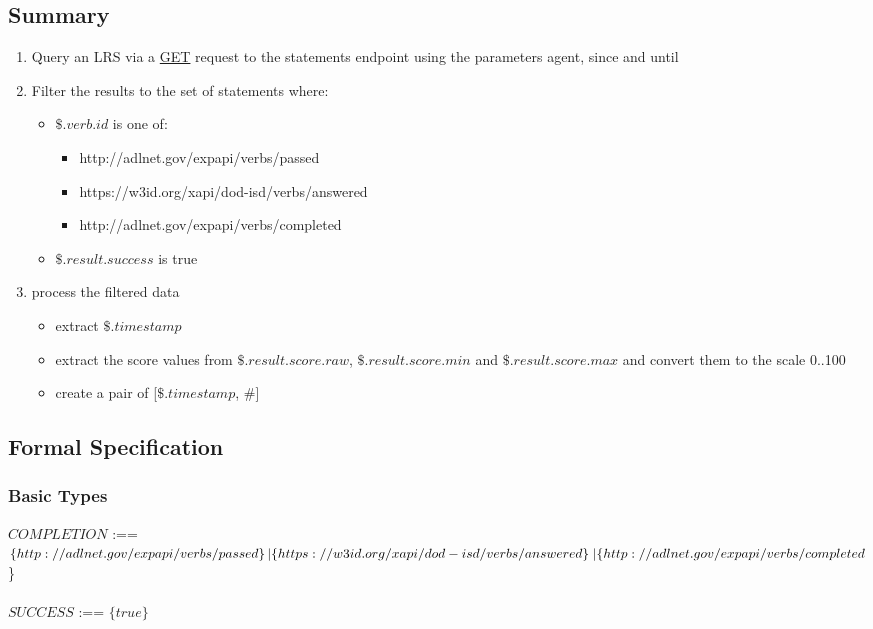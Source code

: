 \documentclass{article}
\begin{document}
\subsection{Summary}
\begin{enumerate}
\item Query an LRS via a \href{https://github.com/adlnet/xAPI-Spec/blob/master/xAPI-Communication.md#213-get-statements}{GET} request to the statements endpoint using the parameters agent, since and until
\item Filter the results to the set of statements where:
  \begin{itemize}
  \item $\$.verb.id$ is one of:
    \begin{itemize}
    \item http://adlnet.gov/expapi/verbs/passed
    \item https://w3id.org/xapi/dod-isd/verbs/answered
    \item http://adlnet.gov/expapi/verbs/completed
    \end{itemize}
  \item $\$.result.success$ is true
  \end{itemize}
\item process the filtered data
  \begin{itemize}
  \item extract $\$.timestamp$
  \item extract the score values from $\$.result.score.raw$,
    $\$.result.score.min$ and $\$.result.score.max$ and convert them
    to the scale 0..100
  \item create a pair of [$\$.timestamp$, $\#$]
  \end{itemize}
\end{enumerate}

\subsection{Formal Specification}
\subsubsection{Basic Types}

$COMPLETION$ :== \\ $\{http://adlnet.gov/expapi/verbs/passed\} \, | \\
\{https://w3id.org/xapi/dod-isd/verbs/answered\} \; | \\
\{http://adlnet.gov/expapi/verbs/completed$\} \\
\\
$SUCCESS$ :== $\{true\}$
\end{document}
